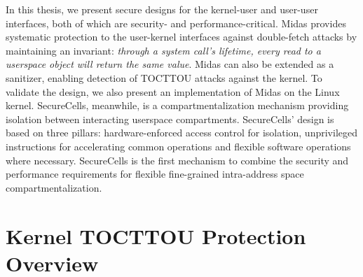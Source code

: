 In this thesis, we present secure designs for the kernel-user and user-user
interfaces, both of which are security- and performance-critical.
Midas provides systematic protection to the user-kernel interfaces against
double-fetch attacks by maintaining an invariant:
\emph{through a system call's lifetime, every read to a userspace object
will return the same value}.
Midas can also be extended as a sanitizer, enabling detection of TOCTTOU
attacks against the kernel.
To validate the design, we also present an implementation of Midas on the
Linux kernel.
SecureCells, meanwhile, is a compartmentalization mechanism providing isolation
between interacting userspace compartments.
SecureCells' design is based on three pillars: hardware-enforced access 
control for isolation, unprivileged instructions for accelerating common
operations and flexible software operations where necessary.
SecureCells is the first mechanism to combine the security and performance
requirements for flexible fine-grained intra-address space 
compartmentalization.


\section{Kernel TOCTTOU Protection Overview}

